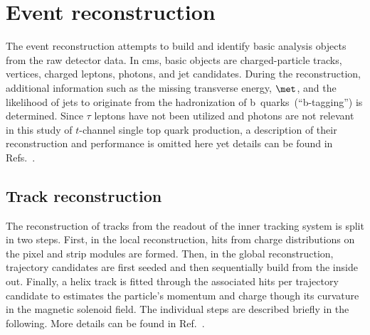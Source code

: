 \chapter{Event reconstruction}
\label{ch:reconstruction}


The event reconstruction attempts to build and identify basic analysis objects from the raw detector data. In \gls{cms}, basic objects are charged-particle tracks, vertices, charged leptons, photons, and jet candidates. During the reconstruction, additional information such as the missing transverse energy, $\met$, and the likelihood of jets to originate from the hadronization of b~quarks~(``b-tagging'') is determined. Since $\tau$ leptons have not been utilized and photons are not relevant in this study of $t$-channel single top quark production, a description of their reconstruction and performance is omitted here yet details can be found in Refs.~\cite{Khachatryan:2015dfa,Khachatryan:2015iwa}.


\section{Track reconstruction}

The reconstruction of tracks from the readout of the inner tracking system is split in two steps. First, in the local reconstruction, hits from charge distributions on the pixel and strip modules are formed. Then, in the global reconstruction, trajectory candidates are first seeded and then sequentially build from the inside out. Finally, a helix track is fitted through the associated hits per trajectory candidate to estimates the particle's momentum and charge though its curvature in the magnetic solenoid field. The individual steps are described briefly in the following. More details can be found in Ref.~\cite{Chatrchyan:2014fea}.

